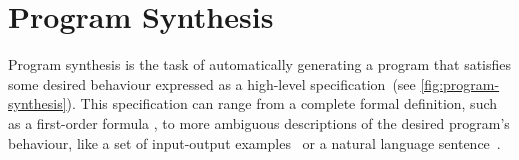 \begin{comment}


\subsection{Regex vs \acp{CFG}} \label{sec:regex-vs-CFG}

Grammars are a more powerful notation than regular expressions. Every construct that can be described by a regular expression can be described by a grammar, but not vice-versa. Alternatively, every regular language is a context-free language, but not vice-versa.

\begin{example}
Consider the regular expression \((a|b)^*abb\) and the \ac{CFG}:

\begin{equation}
\begin{aligned} %
A_0 &\to aA_0 | bA_0 | aA_1\\
A_1 &\to bA_2\\
A_2 &\to bA_3\\
A_3 &\to \epsilon
\end{aligned}
\end{equation}

The regular expression and the grammar describe the same language: the set of strings in \(\{a, b\}\) that end in \(abb\).

\end{example}

\begin{example}
The language \(\mathcal{L} = \{a^n b^n : n \ge 1\}\) is the language of strings in \(\{a, b\}\) that start with some \(a\)s followed by the same number of \(b\)s.  \(\mathcal{L}\) can be defined using a \ac{CFG} but not using a regular expression:  \(\mathcal{L}\) is a context-free language but not a regular language.
\end{example}

\end{comment}


\section{Program Synthesis} \label{sec:ps}

Program synthesis is the task of automatically generating a program that satisfies some desired behaviour expressed as a high-level specification~(see \autoref{fig:program-synthesis}).
This specification can range from a complete formal definition, such as a first-order formula \cite{DBLP:conf/ijcai/Green69,DBLP:conf/pldi/GulwaniJTV11}, to more ambiguous descriptions of the desired program's behaviour, like a set of input-output examples~\cite{balog2017deepcoder,DBLP:conf/pldi/FengMBD18,DBLP:conf/icse/JhaGST10,DBLP:conf/ijcai/ShawWG75,DBLP:journals/jacm/Summers77} or a natural language sentence~\cite{DBLP:conf/icse/DesaiGHJKMRR16,DBLP:journals/pacmpl/Yaghmazadeh0DD17}.

